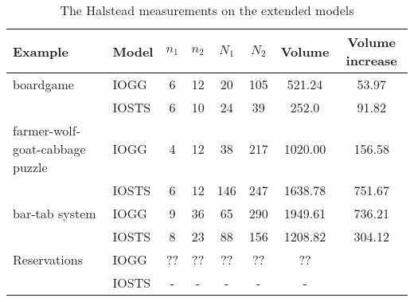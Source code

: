 \begin{table}[ht]
\begin{center}
\begin{tabular}{| l | l | c | c | c | c | c | c |}
  \hline
  \textbf{Example} & \textbf{Model} & $n_1$ & $n_2$ & $N_1$ & $N_2$ & Volume & Volume increase \\ \hline
  boardgame & IOGG & 6 & 12 & 20 & 105 & 521.24 & 53.97 \\ \cline{2-7}
  & IOSTS & 6 & 10 & 24 & 39 & 252.0 & 91.82\\ \hline
  farmer-wolf-goat-cabbage puzzle & IOGG & 4 & 12 & 38 & 217 & 1020.00 & 156.58 \\ \cline{2-7}
  & IOSTS & 6 & 12 & 146 & 247 & 1638.78 & 751.67\\ \hline
  bar-tab system & IOGG & 9 & 36 & 65 & 290 & 1949.61 & 736.21 \\ \cline{2-7}
  & IOSTS & 8 & 23 & 88 & 156 & 1208.82 & 304.12 \\ \hline
  Reservations & IOGG & ?? & ?? & ?? & ?? & ?? \\ \cline{2-7}
  & IOSTS & - & - & - & - & - \\ \hline
\end{tabular}
\end{center}
\caption{The Halstead measurements on the extended models}
\label{tab:halstead-extended}
\end{table}

\begin{comment}
A recent extension on the protocol allows multiple accounts. While an account is not in state open, an idle account can be opened. This allows for a customer to scan his/her products, while another customer pays. Figure~\ref{fig:gg-fwgc-extended} shows the changes to the initial graph and the open account rules. Figure~\ref{fig:close-account-success-ext} shows the success response rule for closing an account: the order of closed accounts have to be kept, because the accounts have to be paid in that order.

\begin{figure}[ht]
  \begin{center}
    \subfloat[The initial graph]{\label{fig:start-scrp-ext}}\hspace{20px}
    \subfloat[The open account success rule]{\label{fig:open-account-success-ext}}\\
    \subfloat[The open account invalid rule]{\label{fig:open-account-invalid-ext}}\hspace{20px}
    \subfloat[The close account success rule]{\label{fig:close-account-success-ext}}
  \end{center}
  \caption{Parts of the extended IOGG of Scanflow Cash Register Protocol}
  \label{fig:gg-fwgc-extended}
\end{figure}
\end{comment}

